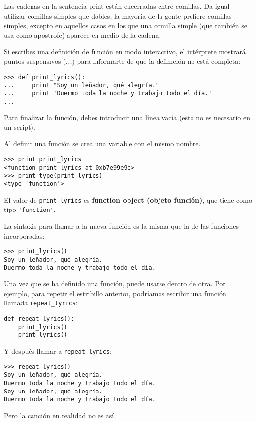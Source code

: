 Las cadenas en la sentencia print están encerradas entre
comillas. Da igual utilizar comillas simples que dobles;
la mayoría de la gente prefiere comillas simples, excepto en aquellos casos en los que
una comilla simple (que también se usa como apostrofe) aparece en medio de la cadena.


Si escribes una definición de función en modo interactivo, el intérprete
mostrará puntos suspensivos (\emph{...}) para informarte de que la definición
no está completa:

\beforeverb
\begin{verbatim}
>>> def print_lyrics():
...     print "Soy un leñador, qué alegría."
...     print 'Duermo toda la noche y trabajo todo el día.'
...
\end{verbatim}
\afterverb
%
Para finalizar la función, debes introducir una línea vacía (esto no
es necesario en un script).

Al definir una función se crea una variable con el mismo nombre.

\beforeverb
\begin{verbatim}
>>> print print_lyrics
<function print_lyrics at 0xb7e99e9c>
>>> print type(print_lyrics)
<type 'function'>
\end{verbatim}
\afterverb
%
El valor de \verb"print_lyrics" es {\bf function object (objeto función)}, que
tiene como tipo \verb"'function'".


La sintaxis para llamar a la nueva función es la misma que
la de las funciones incorporadas:

\beforeverb
\begin{verbatim}
>>> print_lyrics()
Soy un leñador, qué alegría.
Duermo toda la noche y trabajo todo el día.
\end{verbatim}
\afterverb
%
Una vez que se ha definido una función, puede usarse dentro de otra.
Por ejemplo, para repetir el estribillo anterior, podríamos escribir
una función llamada \verb"repeat_lyrics":

\beforeverb
\begin{verbatim}
def repeat_lyrics():
    print_lyrics()
    print_lyrics()
\end{verbatim}
\afterverb
%
Y después llamar a \verb"repeat_lyrics":

\beforeverb
\begin{verbatim}
>>> repeat_lyrics()
Soy un leñador, qué alegría.
Duermo toda la noche y trabajo todo el día.
Soy un leñador, qué alegría.
Duermo toda la noche y trabajo todo el día.
\end{verbatim}
\afterverb
%
Pero la canción en realidad no es así.

